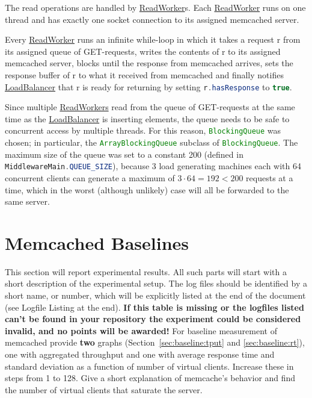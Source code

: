 \documentclass[11pt]{article}
\newcommand{\code}[1]{\lstinline[language=Java]{#1}}
\newcommand{\todo}[1]{\fcolorbox{black}{Apricot}{TODO: #1}}
\newcommand{\linkmain}[1]{\href{https://gitlab.inf.ethz.ch/pungast/asl-fall16-project/blob/master/src/main/java/asl/#1.java}{#1}}
\begin{document}
The read operations are handled by \href{https://gitlab.inf.ethz.ch/pungast/asl-fall16-project/blob/master/src/main/java/asl/ReadWorker.java}{ReadWorker}s. Each \linkmain{ReadWorker} runs on one thread and has exactly one socket connection to its assigned memcached server.

Every \linkmain{ReadWorker} runs an infinite while-loop in which it takes a request r from its assigned queue of GET-requests, writes the contents of r to its assigned memcached server, blocks until the response from memcached arrives, sets the response buffer of r to what it received from memcached and finally notifies \linkmain{LoadBalancer} that r is ready for returning by setting \code{r.hasResponse} to \code{true}.

Since multiple \linkmain{ReadWorkers} read from the queue of GET-requests at the same time as the \linkmain{LoadBalancer} is inserting elements, the queue needs to be safe to concurrent access by multiple threads. For this reason, \code{BlockingQueue} was chosen; in particular, the \code{ArrayBlockingQueue} subclass of \code{BlockingQueue}. The maximum size of the queue was set to a constant 200 (defined in \code{MiddlewareMain.QUEUE_SIZE}), because 3 load generating machines each with 64 concurrent clients can generate a maximum of $3 \cdot 64 = 192 < 200$ requests at a time, which in the worst (although unlikely) case will all be forwarded to the same server.


\section{Memcached Baselines}\label{sec:baseline}

\todo{}

This section will report experimental results. All such parts will start with a short description of the experimental setup. The log files should be identified by a short name, or number, which will be explicitly listed at the end of the document (see Logfile Listing at the end).  \textbf{If this table is missing or the logfiles listed can't be found in your repository the experiment could be considered invalid, and no points will be awarded!}
For baseline measurement of memcached provide \textbf{two} graphs (Section~\ref{sec:baseline:tput} and \ref{sec:baseline:rt}), one with aggregated throughput and one with average response time and standard deviation as a function of number of virtual clients. Increase these in steps from 1 to 128. Give a short explanation of memcache's behavior and find the number of virtual clients that saturate the server.
\end{document}
